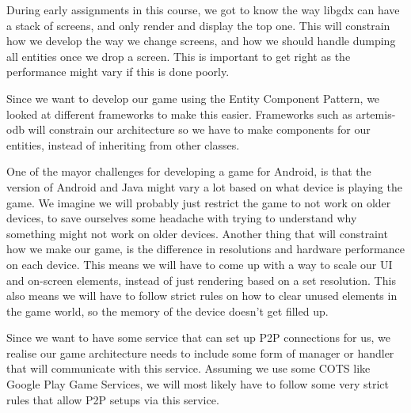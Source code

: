 
During early assignments in this course, we got to know the way libgdx can have a stack of screens, and only render and display the top one. This will constrain how we develop the way we change screens, and how we should handle dumping all entities once we drop a screen. This is important to get right as the performance might vary if this is done poorly.

Since we want to develop our game using the Entity Component Pattern, we looked at different frameworks to make this easier. Frameworks such as artemis-odb will constrain our architecture so we have to make components for our entities, instead of inheriting from other classes.

One of the mayor challenges for developing a game for Android, is that the version of Android and Java might vary a lot based on what device is playing the game. We imagine we will probably just restrict the game to not work on older devices, to save ourselves some headache with trying to understand why something might not work on older devices. Another thing that will constraint how we make our game, is the difference in resolutions and hardware performance on each device. This means we will have to come up with a way to scale our UI and on-screen elements, instead of just rendering based on a set resolution. This also means we will have to follow strict rules on how to clear unused elements in the game world, so the memory of the device doesn't get filled up.

Since we want to have some service that can set up P2P connections for us, we realise our game architecture needs to include some form of manager or handler that will communicate with this service. Assuming we use some COTS like Google Play Game Services, we will most likely have to follow some very strict rules that allow P2P setups via this service.
